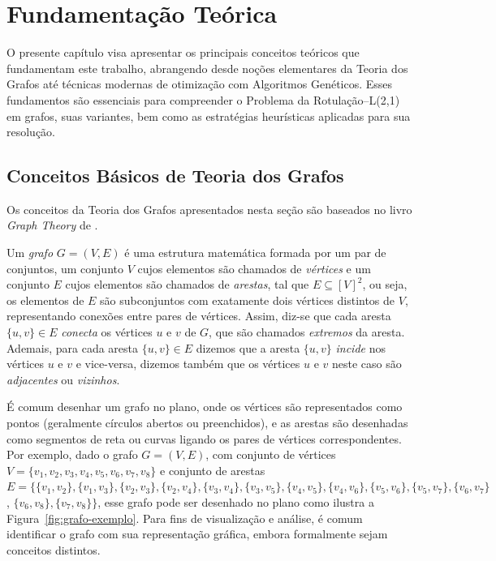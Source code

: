 \chapter{Fundamentação Teórica}
\label{cap:fundamentacao-teorica}

O presente capítulo visa apresentar os principais conceitos teóricos que fundamentam este trabalho, abrangendo desde noções elementares da Teoria dos Grafos até técnicas modernas de otimização com Algoritmos Genéticos. Esses fundamentos são essenciais para compreender o Problema da Rotulação–L(2,1) em grafos, suas variantes, bem como as estratégias heurísticas aplicadas para sua resolução.

\section{Conceitos Básicos de Teoria dos Grafos}

Os conceitos da Teoria dos Grafos  apresentados nesta seção são baseados no livro \emph{Graph Theory} de .

Um \emph{grafo} \( G = (V, E) \) é uma estrutura matemática formada por um par de conjuntos, um conjunto $V$ cujos elementos são chamados de \emph{vértices} e um conjunto $E$ cujos elementos são chamados de \emph{arestas}, tal que \( E \subseteq [V]^2 \), ou seja, os elementos de \( E \) são subconjuntos com exatamente dois vértices distintos de \( V \), representando conexões entre pares de vértices. Assim, diz-se que cada aresta \( \{u, v\} \in E \) \emph{conecta} os vértices \( u \) e \( v \) de $G$, que são chamados \emph{extremos} da aresta. Ademais, para cada aresta \( \{u, v\} \in E \) dizemos que a aresta \( \{u, v\} \) \emph{incide} nos vértices $u$ e $v$ e vice-versa, dizemos também que os vértices $u$ e $v$ neste caso são \emph{adjacentes} ou \emph{vizinhos}.

É comum desenhar um grafo no plano, onde os vértices são representados como pontos (geralmente círculos abertos ou preenchidos), e as arestas são desenhadas como segmentos de reta ou curvas ligando os pares de vértices correspondentes. Por exemplo, dado o grafo \( G = (V, E) \), com conjunto de vértices 
$V = \{v_1, v_2, v_3, v_4, v_5, v_6, v_7, v_8\}$ e conjunto de arestas $E = \{ \{v_1, v_2\}, \{v_1, v_3\}, \{v_2, v_3\}, \{v_2, v_4\}, \{v_3, v_4\}, \{v_3, v_5\},
\{v_4, v_5\}, \{v_4, v_6\}, \{v_5, v_6\}, \{v_5, v_7\}, \{v_6, v_7\}$, $\{v_6, v_8\}, \{v_7, v_8\} \}$, esse grafo pode ser desenhado no plano como ilustra a Figura~\ref{fig:grafo-exemplo}. Para fins de visualização e análise, é comum identificar o grafo com sua representação gráfica, embora formalmente sejam conceitos distintos.


